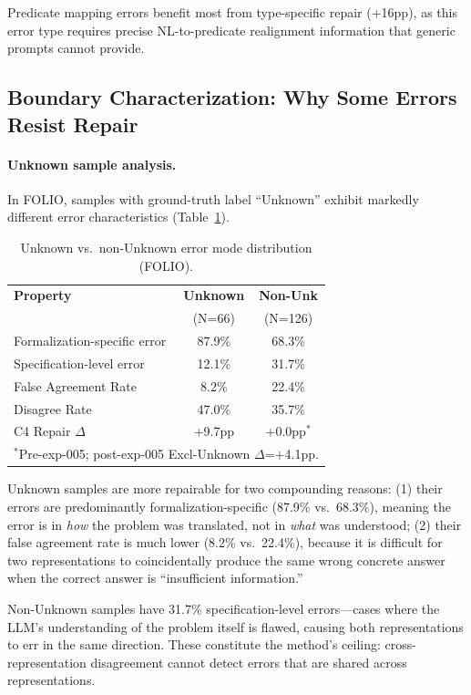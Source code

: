 \documentclass[11pt,a4paper]{article}
\begin{document}
Predicate mapping errors benefit most from type-specific repair (+16pp), as this error type requires precise NL-to-predicate realignment information that generic prompts cannot provide.

\subsection{Boundary Characterization: Why Some Errors Resist Repair}
\label{sec:boundary}

\paragraph{Unknown sample analysis.}
In FOLIO, samples with ground-truth label ``Unknown'' exhibit markedly different error characteristics (Table~\ref{tab:unknown}).

\begin{table}[t]
\centering
\small
\caption{Unknown vs.\ non-Unknown error mode distribution (FOLIO).}
\label{tab:unknown}
\begin{tabular}{@{}lcc@{}}
\toprule
\textbf{Property} & \textbf{Unknown} & \textbf{Non-Unk} \\
& (N=66) & (N=126) \\
\midrule
Formalization-specific error & 87.9\% & 68.3\% \\
Specification-level error & 12.1\% & 31.7\% \\
False Agreement Rate & 8.2\% & 22.4\% \\
Disagree Rate & 47.0\% & 35.7\% \\
C4 Repair $\Delta$ & +9.7pp & +0.0pp$^*$ \\
\bottomrule
\multicolumn{3}{l}{\small $^*$Pre-exp-005; post-exp-005 Excl-Unknown $\Delta$=+4.1pp.}
\end{tabular}
\end{table}

Unknown samples are more repairable for two compounding reasons: (1) their errors are predominantly formalization-specific (87.9\% vs.\ 68.3\%), meaning the error is in \emph{how} the problem was translated, not in \emph{what} was understood; (2) their false agreement rate is much lower (8.2\% vs.\ 22.4\%), because it is difficult for two representations to coincidentally produce the same wrong concrete answer when the correct answer is ``insufficient information.''

Non-Unknown samples have 31.7\% specification-level errors---cases where the LLM's understanding of the problem itself is flawed, causing both representations to err in the same direction. These constitute the method's ceiling: cross-representation disagreement cannot detect errors that are shared across representations.
\end{document}
